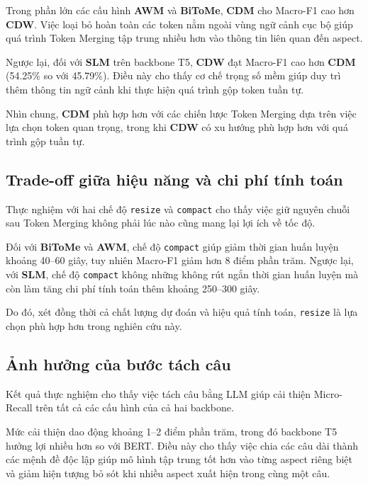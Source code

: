 Trong phần lớn các cấu hình \textbf{AWM} và \textbf{BiToMe},
\textbf{CDM} cho Macro-F1 cao hơn \textbf{CDW}.
Việc loại bỏ hoàn toàn các token nằm ngoài vùng ngữ cảnh cục bộ giúp
quá trình Token Merging tập trung nhiều hơn vào thông tin liên quan đến
aspect.

Ngược lại, đối với \textbf{SLM} trên backbone T5, \textbf{CDW} đạt
Macro-F1 cao hơn \textbf{CDM} (54.25\% so với 45.79\%).
Điều này cho thấy cơ chế trọng số mềm giúp duy trì thêm thông tin ngữ
cảnh khi thực hiện quá trình gộp token tuần tự.

Nhìn chung, \textbf{CDM} phù hợp hơn với các chiến lược Token Merging dựa trên
việc lựa chọn token quan trọng, trong khi \textbf{CDW} có xu hướng phù hợp hơn
với quá trình gộp tuần tự.

\subsection{Trade-off giữa hiệu năng và chi phí tính toán}

Thực nghiệm với hai chế độ \texttt{resize} và \texttt{compact} cho thấy việc giữ nguyên
chuỗi sau Token Merging không phải lúc nào cũng mang lại lợi ích về tốc
độ.

Đối với \textbf{BiToMe} và \textbf{AWM}, chế độ
\texttt{compact} giúp giảm thời gian huấn luyện khoảng 40--60 giây, tuy nhiên
Macro-F1 giảm hơn 8 điểm phần trăm.
Ngược lại, với \textbf{SLM}, chế độ \texttt{compact} không những
không rút ngắn thời gian huấn luyện mà còn làm tăng chi phí tính toán
thêm khoảng 250--300 giây.

Do đó, xét đồng thời cả chất lượng dự đoán và hiệu quả tính toán,
\texttt{resize} là lựa chọn phù hợp hơn trong nghiên cứu này.

\subsection{Ảnh hưởng của bước tách câu}

Kết quả thực nghiệm cho thấy việc tách câu bằng LLM giúp cải thiện
Micro-Recall trên tất cả các cấu hình của cả hai backbone.

Mức cải thiện dao động khoảng 1--2 điểm phần trăm, trong đó backbone
T5 hưởng lợi nhiều hơn so với BERT.
Điều này cho thấy việc chia các câu dài thành các mệnh đề độc lập giúp
mô hình tập trung tốt hơn vào từng aspect riêng biệt và giảm hiện tượng
bỏ sót khi nhiều aspect xuất hiện trong cùng một câu.

